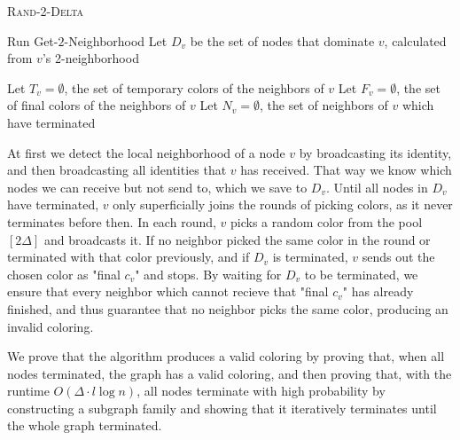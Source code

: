 \begin{algorithm}[ht]
\DontPrintSemicolon 
\caption{\textsc{Rand-2-Delta}}\label{alg:r2d}

Run Get-$2$-Neighborhood \;
Let $D_v$ be the set of nodes that dominate $v$, calculated from $v$'s 2-neighborhood\;

Let $T_v = \emptyset$, the set of temporary colors of the neighbors of $v$\;
Let $F_v = \emptyset$, the set of final colors of the neighbors of $v$\;
Let $N_v = \emptyset$, the set of neighbors of $v$ which have terminated\;



\end{algorithm}

At first we detect the local neighborhood of a node $v$ by broadcasting its identity, and then broadcasting all identities that $v$ has received. That way we know which nodes we can receive but not send to, which we save to $D_v$. Until all nodes in $D_v$ have terminated, $v$ only superficially joins the rounds of picking colors, as it never terminates before then. In each round, $v$ picks a random color from the pool $[2\Delta]$ and broadcasts it. If no neighbor picked the same color in the round or terminated with that color previously, and if $D_v$ is terminated, $v$ sends out the chosen color as "final $c_v$" and stops. By waiting for $D_v$ to be terminated, we ensure that every neighbor which cannot recieve that "final $c_v$" has already finished, and thus guarantee that no neighbor picks the same color, producing an invalid coloring.

We prove that the algorithm produces a valid coloring by proving that, when all nodes terminated, the graph has a valid coloring, and then proving that, with the runtime $O(\Delta \cdot l \log n)$, all nodes terminate with high probability by constructing a subgraph family and showing that it iteratively terminates until the whole graph terminated.


